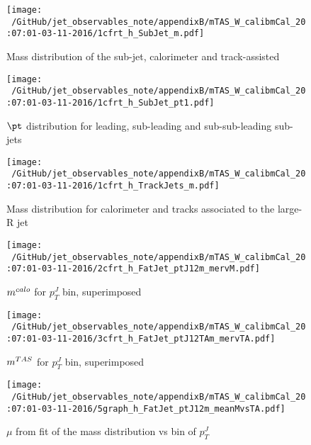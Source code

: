 \begin{figure}
 
\texttt{[image: ~/GitHub/jet\_observables\_note/appendixB/mTAS\_W\_calibmCal\_20:07:01-03-11-2016/1cfrt\_h\_SubJet\_m.pdf]}
\caption{Mass distribution of the sub-jet, calorimeter and track-assisted}
 
\end{figure}
 
\begin{figure}
 
\texttt{[image: ~/GitHub/jet\_observables\_note/appendixB/mTAS\_W\_calibmCal\_20:07:01-03-11-2016/1cfrt\_h\_SubJet\_pt1.pdf]}
\caption{$\pt$ distribution for leading, sub-leading and sub-sub-leading sub-jets}
 
\end{figure}
\begin{figure}
 
\texttt{[image: ~/GitHub/jet\_observables\_note/appendixB/mTAS\_W\_calibmCal\_20:07:01-03-11-2016/1cfrt\_h\_TrackJets\_m.pdf]}
\caption{Mass distribution for calorimeter and tracks associated to the large-R jet}
 
\end{figure}
 
\begin{figure}
 
\texttt{[image: ~/GitHub/jet\_observables\_note/appendixB/mTAS\_W\_calibmCal\_20:07:01-03-11-2016/2cfrt\_h\_FatJet\_ptJ12m\_mervM.pdf]}
\caption{$m^{calo}$ for $p_{T}^{J}$ bin, superimposed}
 
\end{figure}
 
\begin{figure}

\texttt{[image: ~/GitHub/jet\_observables\_note/appendixB/mTAS\_W\_calibmCal\_20:07:01-03-11-2016/3cfrt\_h\_FatJet\_ptJ12TAm\_mervTA.pdf]}
\caption{$m^{TAS}$ for $p_{T}^{J}$ bin, superimposed}

\end{figure}

\begin{figure}

\texttt{[image: ~/GitHub/jet\_observables\_note/appendixB/mTAS\_W\_calibmCal\_20:07:01-03-11-2016/5graph\_h\_FatJet\_ptJ12m\_meanMvsTA.pdf]}
\caption{$\mu$ from fit of the mass distribution vs bin of $p_{T}^{J}$ }

\end{figure}

